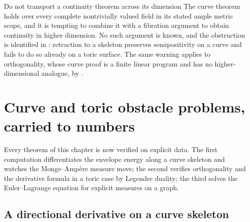 \begin{warning}{Do not transport a continuity theorem across its dimension}
The curve theorem  holds over every complete
nontrivially valued field in its stated ample metric scope, and it is
tempting to combine it with a fibration
argument to obtain continuity in higher dimension.  No such argument is
known, and the obstruction is identified in
: retraction to a skeleton preserves
semipositivity on a curve and fails to do so already on a toric surface.
The same warning applies to orthogonality, whose curve proof
 is a finite linear program and has
no higher-dimensional analogue, by
.
\end{warning}

\section{Curve and toric obstacle problems, carried to numbers}
\label{sec:ch27-worked}

Every theorem of this chapter is now verified on explicit data.  The first
computation differentiates the envelope energy along a curve skeleton and
watches the Monge--Amp\`ere measure move; the second verifies orthogonality
and the derivative formula in a toric case by Legendre duality; the third
solves the Euler--Lagrange equation for explicit measures on a graph.

\subsection{A directional derivative on a curve skeleton}
\label{sec:ch27-curve-numbers}


